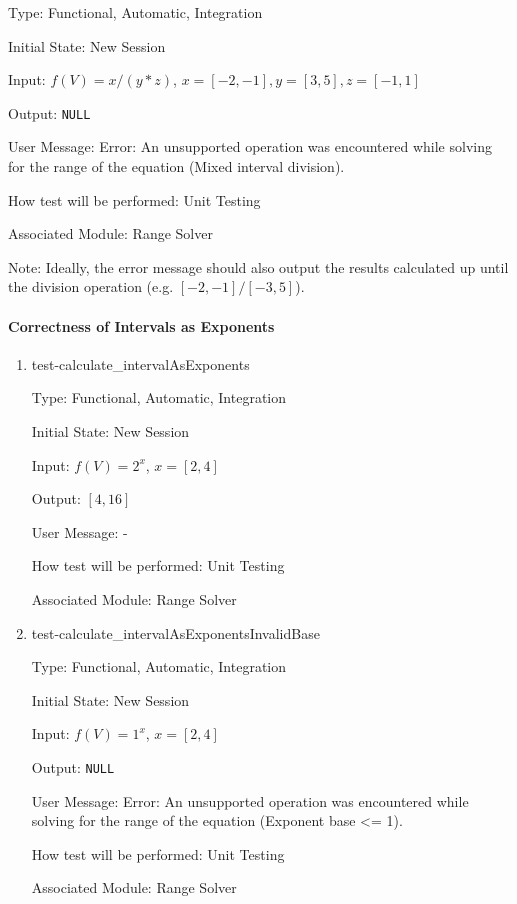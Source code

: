 \documentclass[12pt, titlepage]{article}
\begin{document}
\begin{enumerate}
	Type: Functional, Automatic, Integration
	
	Initial State: New Session
	
	Input: $f(V) = x / (y * z)$, $x = [-2,-1], y = [3,5], z = [-1,1]$
	
	Output: \texttt{NULL}
	
	User Message: Error: An unsupported operation was encountered while solving 
	for the range of the equation (Mixed interval division).
	
	How test will be performed: Unit Testing
	
	Associated Module: Range Solver
	
	Note: Ideally, the error message should also output the results calculated 
	up until the division operation (e.g. $[-2,-1]/[-3,5]$).\\
	
\end{enumerate}

\paragraph{Correctness of Intervals as Exponents}


\begin{enumerate}
	
	\item{test-calculate\_intervalAsExponents}
	
	Type: Functional, Automatic, Integration
	
	Initial State: New Session
	
	Input: $f(V) = 2^x$, $x = [2,4]$
	
	Output: $[4,16]$
	
	User Message: - 
	
	How test will be performed: Unit Testing
	
	Associated Module: Range Solver\\
	
	\item{test-calculate\_intervalAsExponentsInvalidBase}
	
	Type: Functional, Automatic, Integration
	
	Initial State: New Session
	
	Input: $f(V) = 1^x$, $x = [2,4]$
	
	Output: \texttt{NULL}
	
	User Message: Error: An unsupported operation was encountered while solving 
	for the range of the equation (Exponent base <= 1).
	
	How test will be performed: Unit Testing
	
	Associated Module: Range Solver\\
	
\end{enumerate}
\end{document}
